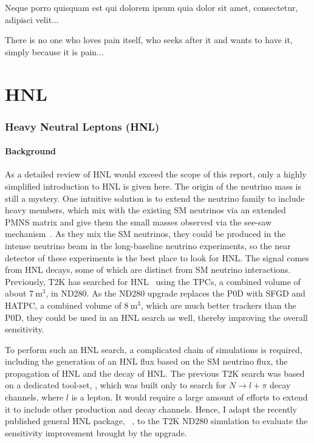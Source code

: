 \begin{savequote}[8cm]
\textlatin{Neque porro quisquam est qui dolorem ipsum quia dolor sit amet, consectetur, adipisci velit...}

There is no one who loves pain itself, who seeks after it and wants to have it, simply because it is pain...
\end{savequote}

\chapter{\label{ch:hnl}HNL} 

\minitoc


    \subsection{Heavy Neutral Leptons (HNL)}
    \subsubsection{Background}
        As a detailed review of HNL would exceed the scope of this report, only a highly simplified introduction to HNL is given here. 
        The origin of the neutrino mass is still a mystery. 
        One intuitive solution is to extend the neutrino family to include heavy members, which mix with the existing SM neutrinos via an extended PMNS matrix and give them the small masses observed via the see-saw mechanism~\cite{Abada_2007}. 
        As they mix the SM neutrinos, they could be produced in the intense neutrino beam in the long-baseline neutrino experiments, so the near detector of these experiments is the best place to look for HNL. 
        The signal comes from HNL decays, some of which are distinct from SM neutrino interactions. 
        Previously, T2K has searched for HNL~\cite{T2K:2019jwa} using the TPCs, a combined volume of about $7~\textrm{m}^3$, in ND280. As 
        the ND280 upgrade replaces the P0D with SFGD and HATPC, a combined volume of $8~\textrm{m}^3$, which are much better trackers than the P0D, they could be used in an HNL search as well, thereby improving the overall sensitivity. 

        To perform such an HNL search, a complicated chain of simulations is required, including the generation of an HNL flux based on the SM neutrino flux, the propagation of HNL and the decay of HNL. 
        The previous T2K search was based on a dedicated tool-set, , which was built only to search for $N\rightarrow l + \pi$ decay channels, where $l$ is a lepton. 
        It would require a large amount of efforts to extend it to include other production and decay channels. 
        Hence, I adapt the recently published general HNL package, ~\cite{Plows:2022gxc}, to the T2K ND280 simulation to evaluate the sensitivity improvement brought by the upgrade.

